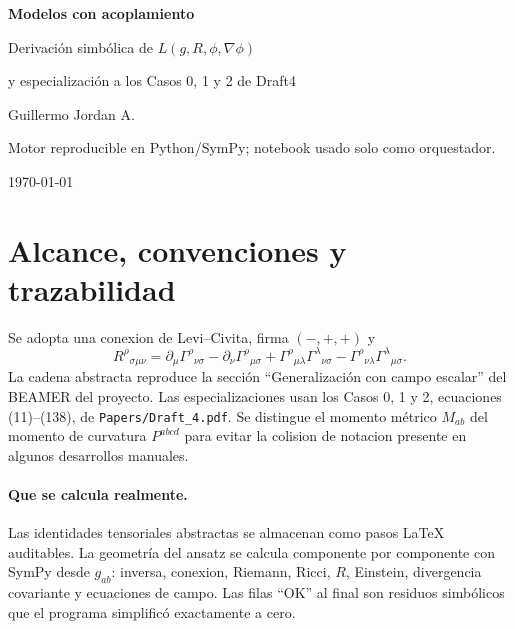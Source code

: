 \documentclass[11pt,a4paper]{article}
\begin{document}
\hypersetup{pageanchor=false}
\begin{titlepage}
\centering
\vspace*{2.4cm}
{\Huge\bfseries Modelos con acoplamiento\par}
\vspace{0.7cm}
{\Large Derivación simbólica de $L(g,R,\phi,\nabla\phi)$\par}
\vspace{0.35cm}
{\large y especialización a los Casos 0, 1 y 2 de Draft4\par}
\vfill
{\large Guillermo Jordan A.\par}
\vspace{0.4cm}
{\small Motor reproducible en Python/SymPy; notebook usado solo como orquestador.\par}
\vfill
{\today\par}
\end{titlepage}
\hypersetup{pageanchor=true}

\tableofcontents
\clearpage
{}

\section{Alcance, convenciones y trazabilidad}
Se adopta una conexion de Levi--Civita, firma $(-,+,+)$ y
\[
R^\rho{}_{\sigma\mu\nu}=\partial_\mu\Gamma^\rho{}_{\nu\sigma}
-\partial_\nu\Gamma^\rho{}_{\mu\sigma}
+\Gamma^\rho{}_{\mu\lambda}\Gamma^\lambda{}_{\nu\sigma}
-\Gamma^\rho{}_{\nu\lambda}\Gamma^\lambda{}_{\mu\sigma}.
\]
La cadena abstracta reproduce la sección ``Generalización con campo escalar'' del
BEAMER del proyecto. Las especializaciones usan los Casos 0, 1 y 2, ecuaciones
(11)--(138), de \texttt{Papers/Draft\_4.pdf}. Se distingue el momento métrico $M_{ab}$ del momento
de curvatura $P^{abcd}$ para evitar la colision de notacion presente en algunos
desarrollos manuales.

\paragraph{Que se calcula realmente.}
Las identidades tensoriales abstractas se almacenan como pasos LaTeX auditables.
La geometría del ansatz se calcula componente por componente con SymPy desde
$g_{ab}$: inversa, conexion, Riemann, Ricci, $R$, Einstein, divergencia covariante
y ecuaciones de campo. Las filas ``OK'' al final son residuos simbólicos que el
programa simplificó exactamente a cero.
\end{document}
